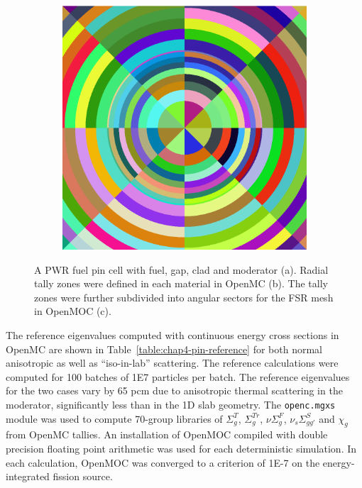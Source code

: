 \begin{figure}[H]
\begin{subfigure}{.32\textwidth}
  \caption{}
\end{subfigure}
\begin{subfigure}{.32\textwidth}
  \centering
  \includegraphics[width=0.9\linewidth]{figures/biases/pin-cell/pin-cell-8x8}
  \caption{}
\end{subfigure}
\caption[Pin cell materials and geometry]{A PWR fuel pin cell with fuel, gap, clad and moderator (a). Radial tally zones were defined in each material in OpenMC (b). The tally zones were further subdivided into angular sectors for the \ac{FSR} mesh in OpenMOC (c).}
\label{fig:chap4-pin-cell}
\end{figure}

The reference eigenvalues computed with continuous energy cross sections in OpenMC are shown in Table~\ref{table:chap4-pin-reference} for both normal anisotropic as well as ``iso-in-lab'' scattering. The reference calculations were computed for 100 batches of 1E7 particles per batch. The reference eigenvalues for the two cases vary by 65 pcm due to anisotropic thermal scattering in the moderator, significantly less than in the 1D slab geometry. The \texttt{openc.mgxs} module was used to compute 70-group libraries of $\Sigma^T_g$, $\Sigma^{Tr}_g$, $\nu\Sigma^F_g$, $\nu_s\Sigma^S_{gg'}$ and $\chi_g$ from OpenMC tallies. An installation of OpenMOC compiled with double precision floating point arithmetic was used for each deterministic simulation. In each calculation, OpenMOC was converged to a criterion of 1E-7 on the energy-integrated fission source.

